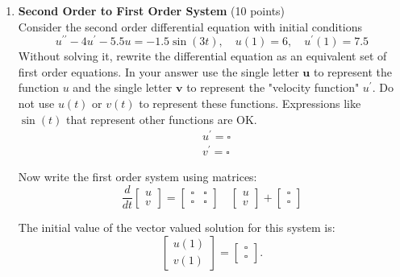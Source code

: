 \begin{enumerate}
  \item \textbf{Second Order to First Order System} (10 points)\\
  Consider the second order differential equation with initial conditions
  $$
  u^{\prime \prime}-4 u^{\prime}-5.5 u=-1.5 \sin (3 t), \quad u(1)=6, \quad u^{\prime}(1)=7.5
  $$
  Without solving it, rewrite the differential equation as an equivalent set of first order equations. In your answer use the single letter $\mathbf{u}$ to represent the function $u$ and the single letter $\mathbf{v}$ to represent the "velocity function" $u^{\prime}$. Do not use $u(t)$ or $v(t)$ to represent these functions. Expressions like $\sin (t)$ that represent other functions are OK.
  $$
  \begin{aligned}
  & u^{\prime}=\square \\
  & v^{\prime}=\square
  \end{aligned}
  $$
  \begin{subanswer}
  \end{subanswer}
  Now write the first order system using matrices:
  $$
  \frac{d}{d t}\left[\begin{array}{l}
  u \\
  v
  \end{array}\right]=\left[\begin{array}{ll}
  \square & \square \\
  \square & \square
  \end{array}\right] \quad\left[\begin{array}{l}
  u \\
  v
  \end{array}\right]+\left[\begin{array}{l}
  \square \\
  \square
  \end{array}\right]
  $$
  \begin{subanswer}
  \end{subanswer}
  The initial value of the vector valued solution for this system is:
  $$
  \left[\begin{array}{l}
  u(1) \\
  v(1)
  \end{array}\right]=\left[\begin{array}{l}
  \square \\
  \square
  \end{array}\right] .
  $$
  \begin{subanswer}
  \end{subanswer}


\end{enumerate}
